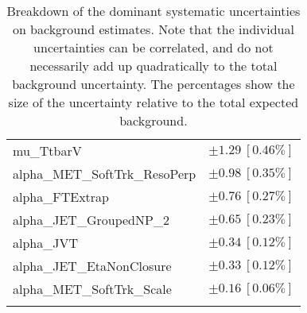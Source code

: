 \begin{table}
\begin{center}
\begin{tabular*}{\textwidth}{@{\extracolsep{\fill}}lc}
mu\_TtbarV         & $\pm 1.29\ [0.46\%] $       \\
alpha\_MET\_SoftTrk\_ResoPerp         & $\pm 0.98\ [0.35\%] $       \\
alpha\_FTExtrap         & $\pm 0.76\ [0.27\%] $       \\
alpha\_JET\_GroupedNP\_2         & $\pm 0.65\ [0.23\%] $       \\
alpha\_JVT         & $\pm 0.34\ [0.12\%] $       \\
alpha\_JET\_EtaNonClosure         & $\pm 0.33\ [0.12\%] $       \\
alpha\_MET\_SoftTrk\_Scale         & $\pm 0.16\ [0.06\%] $       \\
\noalign{\smallskip}\hline\noalign{\smallskip}
\end{tabular*}
\end{center}
\caption[Breakdown of uncertainty on background estimates]{
Breakdown of the dominant systematic uncertainties on background estimates.
Note that the individual uncertainties can be correlated, and do not necessarily add up quadratically to 
the total background uncertainty. The percentages show the size of the uncertainty relative to the total expected background.
\label{table.results.bkgestimate.uncertainties.VRTopC}}
\end{table}
%
